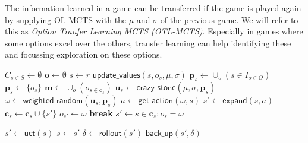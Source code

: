 The information learned in a game can be transferred if the game is played
again by supplying OL-MCTS with the $\mu$ and $\sigma$ of the previous game. We
will refer to this as \emph{Option Tranfer Learning MCTS (OTL-MCTS)}. Especially
in games where some options excel over the others, transfer learning can help
identifying these and focussing exploration on these options. 

\begin{algorithm}
	\caption{$\mathsf{OL-MCTS}(O, r, t, d, v, \mu, \sigma)$}
	\label{alg:olmcts}
	\begin{algorithmic}[1]
		\State $C_{s \in S} \gets \emptyset$
		\State $\mathbf{o} \gets \emptyset$
		 \label{alg:olmcts:mainloop}
			\State $s \gets r$
			 \label{alg:olmcts:innerloop}
				 \label{alg:olmcts:sp}
					\State $\mathsf{update\_values}(s, o_s, \mu, \sigma)$ 
					\State $\mathbf{p}_s \gets \cup_o (s \in I_{o \in O})$
				\Else
					\State $\mathbf{p}_s \gets \{o_s\}$
				\EndIf \label{alg:olmcts:scs}
				\State $\mathbf{m} \gets \cup_o (o_{s \in \mathbf{c}_s})$
				 
					\State $\mathbf{u}_s \gets \mathsf{crazy\_stone}(\mu, \sigma, \mathbf{p}_s)$
					\State $\omega \gets \mathsf{weighted\_random}(\mathbf{u}_s, \mathbf{p}_s)$
					 
						\State $a \gets \mathsf{get\_action}(\omega, s)$ 
						\State $s' \gets \mathsf{expand}(s, a)$ 
						\State $\mathbf{c}_s \gets \mathbf{c}_s \cup \{s'\}$
						\State $o_{s'} \gets \omega$
						\State \textbf{break}
					\Else
						\State $s' \gets s \in \mathbf{c}_s : o_s = \omega$
					\EndIf

				\Else \Comment{Apply \textsf{uct}}
					\State $s' \gets \mathsf{uct}(s)$ \label{alg:olmcts:uct}
				\EndIf \label{alg:olmcts:ecs}
				\State $s \gets s'$ \label{alg:olmcts:ss}
			\EndWhile
			\State $\delta \gets \mathsf{rollout}(s')$ \label{alg:olmcts:rollout}
			\State $\mathsf{back\_up}(s', \delta)$ \label{alg:olmcts:backup}
		\EndWhile
	\end{algorithmic}
\end{algorithm}
